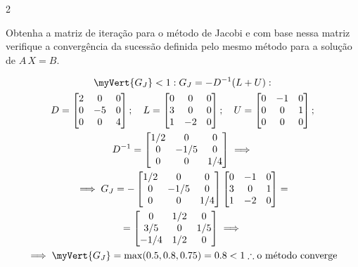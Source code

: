 \documentclass[CN_A-Tests_Resolutions.tex]{subfiles}
\begin{document}
\begin{questionBox}2{} %

  Obtenha a matriz de iteração para o método de Jacobi e com base nessa matriz verifique a convergência da sucessão definida pelo mesmo método para a solução de \(A\,X=B\).

  \answer{}

  \begin{gather*}
    \myVert{G_J}<1:
    G_J
    =-D^{-1}(L+U):\\
    D = \begin{bmatrix}
      2 & 0 & 0
      \\ 0 & -5 & 0
      \\ 0 & 0 & 4
    \end{bmatrix}
    ;\quad
    L = \begin{bmatrix}
      0 & 0 & 0
      \\ 3 & 0 & 0
      \\ 1 & -2 & 0
    \end{bmatrix}
    ;\quad
    U = \begin{bmatrix}
      0 & -1 & 0
      \\ 0 & 0 & 1
      \\ 0 & 0 & 0
    \end{bmatrix};
    \\
    D^{-1}=\begin{bmatrix}
      1/2 & 0 & 0
      \\ 0 & -1/5 & 0
      \\ 0 & 0 & 1/4
    \end{bmatrix}
    \implies \\
    \implies
    G_J
    = -\begin{bmatrix}
      1/2 & 0 & 0
      \\ 0 & -1/5 & 0
      \\ 0 & 0 & 1/4
    \end{bmatrix}
    \begin{bmatrix}
      0 & -1 & 0
      \\ 3 & 0 & 1
      \\ 1 & -2 & 0
    \end{bmatrix}
    = \\
    =\begin{bmatrix}
      0 & 1/2 & 0
      \\ 3/5 & 0 & 1/5
      \\ -1/4 & 1/2 & 0
    \end{bmatrix}
    \implies \\
    \implies
    \myVert{G_J}
    =\max(0.5,0.8,0.75)
    =0.8<1
    \therefore
    \text{o método converge}
  \end{gather*}

\end{questionBox}
\end{document}
